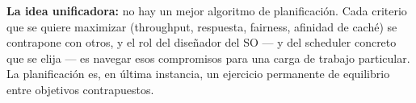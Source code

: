\documentclass[11pt,a4paper]{article}
\begin{document}
\begin{importante}
\textbf{La idea unificadora:} no hay un mejor algoritmo de
planificación. Cada criterio que se quiere maximizar (throughput,
respuesta, fairness, afinidad de caché) se contrapone con otros, y
el rol del diseñador del SO --- y del scheduler concreto que se
elija --- es navegar esos compromisos para una carga de trabajo
particular. La planificación es, en última instancia, un ejercicio
permanente de equilibrio entre objetivos contrapuestos.
\end{importante}
\end{document}
